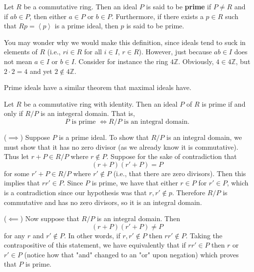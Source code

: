 \documentclass[12pt,letterpaper]{algebra_book}
\newcommand{\ZZ}{\mathbb{Z}}
\theoremstyle{definition}
\begin{document}
    \begin{definition}
        Let $R$ be a commutative ring. Then an ideal $P$ is said
        to be \textbf{prime} if $P \ne R$ and if $ab \in P$, then
        either $a \in P$ or $b \in P$. Furthermore, if there
        exists a $p \in R$ such that $Rp = \left< p \right>$ is a
        prime ideal, then $p$ is said to be prime.
    \end{definition}

    \textcolor{NavyBlue}{You may wonder why we would make this definition, since ideals tend to suck in elements of
    $R$ (i.e., $ri \in R$ for all $i \in I$, $r \in R$). However,
    just because $ab \in I$ does not mean $a \in I$ or $b \in I$. 
    Consider for instance the ring $4\ZZ$. Obviously, $4 \in
    4\ZZ$, but $2\cdot2 = 4$ and yet $2 \not\in 4\ZZ$.}

    Prime ideals have a similar theorem that maximal ideals have. 

    \begin{thm}\label{prime_theorem}
        Let $R$ be a commutative ring with identity. Then an ideal
        $P$ of $R$ is prime if and only if $R/P$ is an integeral
        domain. That is, 
        \[
            P \text{ is prime } \iff R/P \text{ is an integral domain.}
        \]
        \vspace{-0.8cm}
    \end{thm}

    \begin{prf}
        ($\implies$) Suppose $P$ is a prime ideal. To show that $R/P$ is an
        integral domain, we must show that it has no zero divisor
        (as we already know it is commutative). Thus 
        let $r + P \in R/P$ where $r \not\in P$.
        Suppose for the sake of contradiction that
        \[
            (r + P)(r' + P) = P   
        \]
        for some $r' + P \in R/P$ where $r' \not\in P$ (i.e.,
        that there are zero divisors). Then this
        implies that $rr' \in P$. Since $P$ is prime, we have that
        either $r \in P$ for $r' \in P$, which is a contradiction
        since our hypothesis was that $r, r' \not\in p$. Therefore
        $R/P$ is commutative and has no zero divisors, so it is an
        integral domain. 

        ($\impliedby$) Now suppose that $R/P$ is an integral
        domain. Then 
        \[
            (r + P)(r' + P) \ne P
        \]
        for any $r$ and $r' \not\in P$. In other words, if $r, r'
        \not\in P$ then $rr' \not\in P$. Taking the contrapositive of
        this statement, we have equivalently that if $rr' \in P$
        then $r$ or $r' \in P$ (notice how that "and" changed to
        an "or" upon negation) which proves that $P$ is prime.
    \end{prf}
\end{document}
